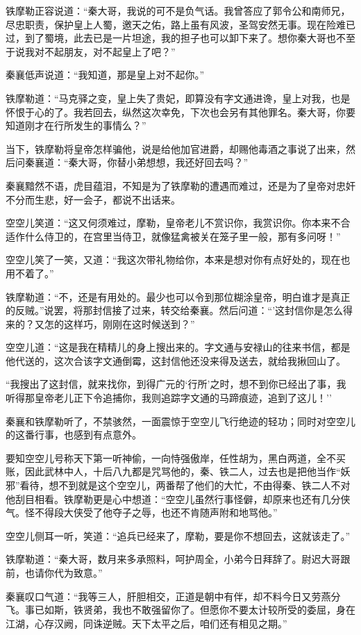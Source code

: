\documentclass[12pt,oneside]{book}
\begin{document}
铁摩勒正容说道：``秦大哥，我说的可不是负气话。我曾答应了郭令公和南师兄，尽忠职责，保护皇上人蜀，邀天之佑，路上虽有风波，圣驾安然无事。现在险难已过，到了蜀境，此去已是一片坦途，我的担子也可以卸下来了。想你秦大哥也不至于说我对不起朋友，对不起皇上了吧？''

秦襄低声说道：``我知道，那是皇上对不起你。''

铁摩勒道：``马克驿之变，皇上失了贵妃，即算没有字文通进谗，皇上对我，也是怀恨于心的了。我若回去，纵然这次幸免，下次也会另有其他罪名。秦大哥，你要知道刚才在行所发生的事情么？''

当下，铁摩勒将皇帝怎样骗他，说是给他加官进爵，却赐他毒酒之事说了出来，然后问秦襄道：``秦大哥，你替小弟想想，我还好回去吗？''

秦襄黯然不语，虎目蕴泪，不知是为了铁摩勒的遭遇而难过，还是为了皇帝对忠奸不分而生悲，好一会子，都说不出话来。

空空儿笑道：``这又何须难过，摩勒，皇帝老儿不赏识你，我赏识你。你本来不合适作什么侍卫的，在宫里当侍卫，就像猛禽被关在笼子里一般，那有多问呀！''

空空儿笑了一笑，又道：``我这次带礼物给你，本来是想对你有点好处的，现在也用不着了。''

铁摩勒道：``不，还是有用处的。最少也可以令到那位糊涂皇帝，明白谁才是真正的反贼。''说罢，将那封信接了过来，转交给秦襄。然后问道：``'这封信你是怎么得来的？又怎的这样巧，刚刚在这时候送到？''

空空儿道：``这是我在精精儿的身上搜出来的。字文通与安禄山的往来书信，都是他代送的，这次合该字文通倒霉，这封信他还没来得及送去，就给我揪回山了。

``我搜出了这封信，就来找你，到得广元的`行所'之时，想不到你已经出了事，我听得那皇帝老儿正下令追捕你，我则追踪字文通的马蹄痕迹，追到了这儿！''

秦襄和铁摩勒听了，不禁骇然，一面震惊于空空儿飞行绝迹的轻功；同时对空空儿的这番行事，也感到有点意外。

要知空空儿号称天下第一听神偷，一向恃强傲岸，任性胡为，黑白两道，全不买账，因此武林中人，十后八九都是咒骂他的，秦、铁二人，过去也是把他当作``妖邪''看待，想不到就是这个空空儿，两番帮了他们的大忙，不由得秦、铁二人不对他刮目相看。铁摩勒更是心中想道：``空空儿虽然行事怪僻，却原来也还有几分侠气。怪不得段大侠受了他夺子之辱，也还不肯随声附和地骂他。''

空空儿侧耳一听，笑道：``追兵已经来了，摩勒，要是你不想回去，这就该走了。''

铁摩勒道：``秦大哥，数月来多承照料，呵护周全，小弟今日拜辞了。尉迟大哥跟前，也请你代为致意。''

秦襄叹口气道：``我等三人，肝胆相交，正道是朝中有伴，却不料今日又劳燕分飞。事已如斯，铁贤弟，我也不敢强留你了。但愿你不要太计较所受的委屈，身在江湖，心存汉阙，同诛逆贼。天下太平之后，咱们还有相见之期。''
\end{document}
